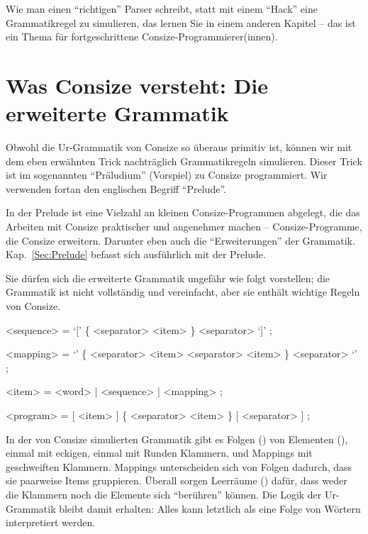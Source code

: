 

Wie man einen "`richtigen"' Parser schreibt, statt mit einem "`Hack"' eine Grammatikregel zu simulieren, das lernen Sie in einem anderen Kapitel -- das ist ein Thema für fortgeschrittene Consize-Programmierer(innen).

\section{Was Consize versteht: Die erweiterte Grammatik}

Obwohl die Ur-Grammatik von Consize so überaus primitiv ist, können wir mit dem eben erwähnten Trick nachträglich Grammatikregeln simulieren. Dieser Trick ist im sogenannten "`Präludium"' (Vorspiel) zu Consize programmiert. Wir verwenden fortan den englischen Begriff "`Prelude"'.

In der Prelude ist eine Vielzahl an kleinen Consize-Programmen abgelegt, die das Arbeiten mit Consize praktischer und angenehmer machen -- Consize-Programme, die Consize erweitern. Darunter eben auch die "`Erweiterungen"' der Grammatik. Kap.~\ref{Sec:Prelude} befasst sich ausführlich mit der Prelude.

Sie dürfen sich die erweiterte Grammatik ungefähr wie folgt vorstellen; die Grammatik ist nicht vollständig und vereinfacht, aber sie enthält wichtige Regeln von Consize.

\begin{grammar}
<sequence> = `[' \{ <separator> <item> \} <separator> `]' ;

<mapping> = `{' \{ <separator> <item> <separator> <item> \} <separator> `}' ;

<item> = <word> | <sequence> | <mapping> ;

<program> = [ <item> ] \{ <separator> <item> \} [ <separator> ] ;
\end{grammar}

In der von Consize simulierten Grammatik gibt es Folgen () von Elementen (), einmal mit eckigen, einmal mit Runden Klammern, und Mappings mit geschweiften Klammern. Mappings unterscheiden sich von Folgen dadurch, dass sie paarweise Items gruppieren.
Überall sorgen Leerräume () dafür, dass weder die Klammern noch die Elemente sich "`berühren"' können. Die Logik der Ur-Grammatik bleibt damit erhalten: Alles kann letztlich als eine Folge von Wörtern interpretiert werden.

